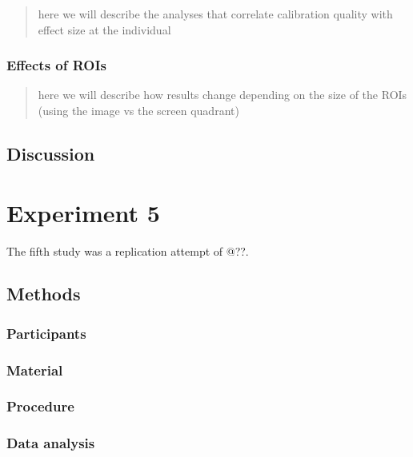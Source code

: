 \documentclass[
  english,
  man]{apa6}
\begin{document}
\begin{quote}
here we will describe the analyses that correlate calibration quality with effect size at the individual
\end{quote}

\hypertarget{effects-of-rois}{%
\subsubsection{Effects of ROIs}\label{effects-of-rois}}

\begin{quote}
here we will describe how results change depending on the size of the ROIs (using the image vs the screen quadrant)
\end{quote}

\hypertarget{discussion-3}{%
\subsection{Discussion}\label{discussion-3}}

\hypertarget{experiment-5}{%
\section{Experiment 5}\label{experiment-5}}

The fifth study was a replication attempt of @??.

\hypertarget{methods-4}{%
\subsection{Methods}\label{methods-4}}

\hypertarget{participants-4}{%
\subsubsection{Participants}\label{participants-4}}

\hypertarget{material-3}{%
\subsubsection{Material}\label{material-3}}

\hypertarget{procedure-4}{%
\subsubsection{Procedure}\label{procedure-4}}

\hypertarget{data-analysis-3}{%
\subsubsection{Data analysis}\label{data-analysis-3}}
\end{document}
